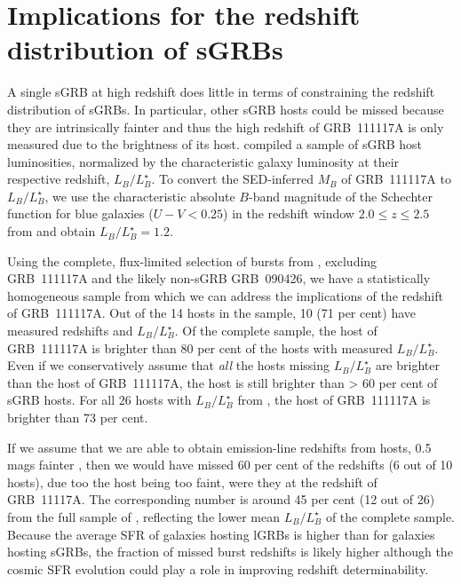 \documentclass{aa}    %
\begin{document}


\section{Implications for the redshift distribution of sGRBs}


A single sGRB at high redshift does little in terms of constraining the redshift
distribution of sGRBs. In particular, other sGRB hosts could be missed because
they are intrinsically fainter and thus the high redshift of GRB~111117A is only
measured due to the brightness of its host. \citet{Berger2014} compiled a
sample of sGRB host luminosities, normalized by the characteristic galaxy
luminosity at their respective redshift, $L_B/L^{\star}_{B}$. To convert the
SED-inferred $M_B$ of GRB~111117A to $L_B/L^{\star}_{B}$, we use the
characteristic absolute $B$-band magnitude of the Schechter function for blue
galaxies ($U - V < 0.25$) in the redshift window $2.0 \leq z \leq 2.5$ from
\citet{Marchesini2007} and obtain $L_B/L^{\star}_{B} = 1.2$.

Using the complete, flux-limited selection of bursts from \citet{DAvanzo2014a},
excluding GRB~111117A and the likely non-sGRB GRB~090426, we have a
statistically homogeneous sample from which we can address the implications of
the redshift of GRB~111117A. Out of the 14 hosts in the sample, 10 (71 per cent)
have measured redshifts and $L_B/L^{\star}_{B}$. Of the complete sample, the
host of GRB~111117A  is brighter than 80 per cent of the hosts with measured
$L_B/L^{\star}_{B}$. Even if we conservatively assume that \textit{all} the
hosts missing $L_B/L^{\star}_{B}$ are brighter than the host of GRB~111117A, the
host is still brighter than > 60 per cent of sGRB hosts. For all 26 hosts with
$L_B/L^{\star}_{B}$ from \citet{Berger2014}, the host of GRB~111117A is brighter
than 73 per cent.

If we assume that we are able to obtain emission-line redshifts from hosts, 0.5
mags fainter \citep[$R < 24.5$~mag;][]{Kruhler2012}, then we would have missed
60 per cent of the redshifts (6 out of 10 hosts), due too the host being too
faint, were they at the redshift of GRB~11117A. The corresponding number is
around 45 per cent (12 out of 26) from the full sample of \citet{Berger2014},
reflecting the lower mean $L_B/L^{\star}_{B}$ of the complete sample. Because
the average SFR of galaxies hosting lGRBs is higher than for galaxies hosting
sGRBs, the fraction of missed burst redshifts is likely higher although the
cosmic SFR evolution could play a role in improving redshift determinability.
\end{document}
